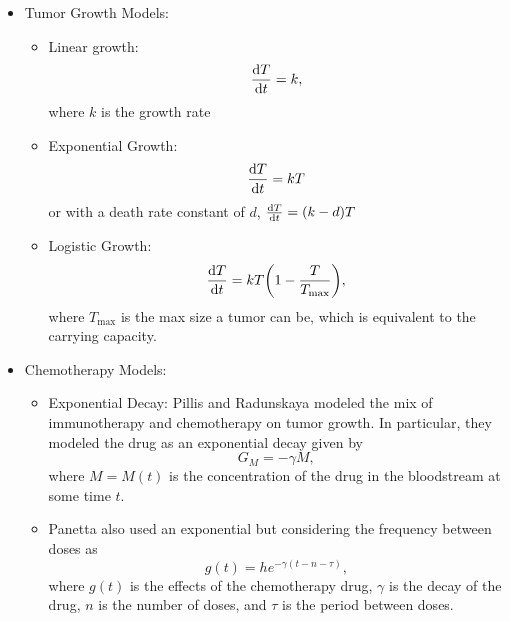 \documentclass[11pt]{amsart}
\begin{document}
\begin{itemize}

	\item Tumor Growth Models:
		\begin{itemize}
	\item Linear growth: 
		\begin{equation}
			\frac{\mathop{}\!\mathrm{d} T}{\mathop{}\!\mathrm{d} t} = k,
			\label{eq: lin}
		\end{equation}
		where $k$ is the growth rate
	\item Exponential Growth:
		\begin{equation}
			\frac{\mathop{}\!\mathrm{d} T}{\mathop{}\!\mathrm{d} t} = kT \label{eq: exp}
		\end{equation}
	 or with a death rate constant of $d$, $\frac{\mathop{}\!\mathrm{d} T}{\mathop{}\!\mathrm{d} t} = (k-d)T$
	\item Logistic Growth: 
		\begin{equation}
			\frac{\mathop{}\!\mathrm{d} T}{\mathop{}\!\mathrm{d} t} = kT \biggl(1- \frac{T}{T_{\max}}\biggr)\label{eq: logistic},
		\end{equation}
		where $T_{\max}$ is the max size a tumor can be, which is equivalent to the carrying capacity.
		\end{itemize}
		
	\item Chemotherapy Models: 
		\begin{itemize}
			\item Exponential Decay: Pillis and Radunskaya modeled the mix of immunotherapy and chemotherapy on tumor growth. In particular, they modeled the drug as an exponential decay given by 
				\begin{equation}
					G_M = -\gamma M \label{eq: Pillis},
				\end{equation}
				where $M=M(t)$ is the concentration of the drug in the bloodstream at some time $t$.
				
			\item Panetta also used an exponential but considering the frequency between doses as
				\begin{equation}
					g(t) = h e^{-\gamma(t-n-\tau)} \label{eq:PanettaExpDec},
				\end{equation}
				where $g(t)$ is the effects of the chemotherapy drug, $\gamma$ is the decay of the drug, $n$ is the number of doses, and $\tau$ is the period between doses.
				

\end{itemize}
\end{itemize}
\end{document}
